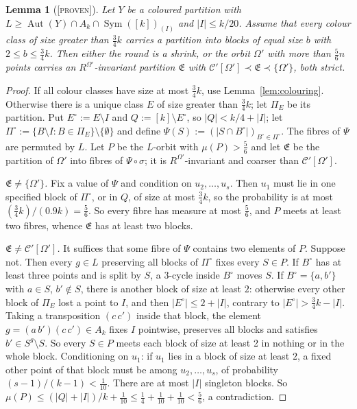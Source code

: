 \documentclass[11pt]{article}
\newtheorem{lemma}[theorem]{Lemma}
\theoremstyle{definition}
\theoremstyle{remark}
\newcommand{\Sym}{\operatorname{Sym}}
\newcommand{\Aut}{\operatorname{Aut}}
\newcommand{\C}{\mathcal C}
\newcommand{\fE}{\mathfrak E}
\newcommand{\Proven}{\textsc{[proven]}}
\begin{document}
\begin{lemma}[\Proven]\label{lem:partition}
Let $Y$ be a coloured partition with $L\ge\Aut(Y)\cap A_k\cap\Sym([k])_{(I)}$ and $|I|\le k/20$. Assume that every colour class of size greater than $\tfrac34k$ carries a partition into blocks of equal size $b$ with $2\le b\le\tfrac34k$. Then either the round is a shrink, or the orbit $\Omega'$ with more than $\tfrac56n$ points carries an $R^{\Omega'}$-invariant partition $\fE$ with $\C'[\Omega']\prec\fE\prec\{\Omega'\}$, both strict.
\end{lemma}
\begin{proof}
If all colour classes have size at most $\tfrac34k$, use Lemma~\ref{lem:colouring}. Otherwise there is a unique class $E$ of size greater than $\tfrac34k$; let $\Pi_E$ be its partition. Put $E^\circ:=E\setminus I$ and $Q:=[k]\setminus E^\circ$, so $|Q|<k/4+|I|$; let $\Pi^\circ:=\{B\setminus I:B\in\Pi_E\}\setminus\{\emptyset\}$ and define $\Psi(S):=(|S\cap B^\circ|)_{B^\circ\in\Pi^\circ}$. The fibres of $\Psi$ are permuted by $L$. Let $P$ be the $L$-orbit with $\mu(P)>\tfrac56$ and let $\fE$ be the partition of $\Omega'$ into fibres of $\Psi\circ\sigma$; it is $R^{\Omega'}$-invariant and coarser than $\C'[\Omega']$.

\emph{$\fE\ne\{\Omega'\}$.} Fix a value of $\Psi$ and condition on $u_2,\dots,u_s$. Then $u_1$ must lie in one specified block of $\Pi^\circ$, or in $Q$, of size at most $\tfrac34k$, so the probability is at most $(\tfrac34 k)/(0.9k)=\tfrac56$. So every fibre has measure at most $\tfrac56$, and $P$ meets at least two fibres, whence $\fE$ has at least two blocks.

\emph{$\fE\ne\C'[\Omega']$.} It suffices that some fibre of $\Psi$ contains two elements of $P$. Suppose not. Then every $g\in L$ preserving all blocks of $\Pi^\circ$ fixes every $S\in P$. If $B^\circ$ has at least three points and is split by $S$, a $3$-cycle inside $B^\circ$ moves $S$. If $B^\circ=\{a,b'\}$ with $a\in S$, $b'\notin S$, there is another block of size at least $2$: otherwise every other block of $\Pi_E$ lost a point to $I$, and then $|E^\circ|\le 2+|I|$, contrary to $|E^\circ|>\tfrac34k-|I|$. Taking a transposition $(c\,c')$ inside that block, the element $g=(a\,b')(c\,c')\in A_k$ fixes $I$ pointwise, preserves all blocks and satisfies $b'\in S^g\setminus S$. So every $S\in P$ meets each block of size at least 2 in nothing or in the whole block. Conditioning on $u_1$: if $u_1$ lies in a block of size at least $2$, a fixed other point of that block must be among $u_2,\dots,u_s$, of probability $(s-1)/(k-1)<\tfrac1{10}$. There are at most $|I|$ singleton blocks. So $\mu(P)\le(|Q|+|I|)/k+\tfrac1{10}\le\tfrac14+\tfrac1{10}+\tfrac1{10}<\tfrac56$, a contradiction.
\end{proof}
\end{document}
